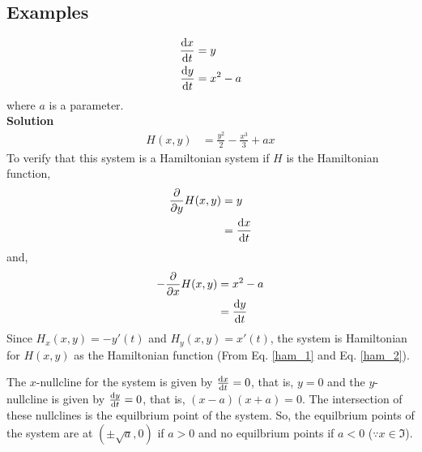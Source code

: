 \documentclass[11pt,1in]{article}
\newenvironment{Example}[2][Example]{\begin{trivlist}
		\item[\hskip \labelsep {\bfseries #1}\hskip \labelsep {\bfseries #2.}]}{\end{trivlist}}
\begin{document}
\subsection{Examples}
\begin{Example}{1}
	\begin{align*}
	\derivative{x}{t} &= y \\
	\derivative{y}{t} &= x^2 - a
	\end{align*}
	where $a$ is a parameter. \\
	{\bfseries Solution\\}
	\begin{align*}
	H(x,y) &= \frac{y^2}{2} - \frac{x^3}{3} + ax
	\end{align*}
	To verify that this system is a Hamiltonian system if $H$ is the Hamiltonian function,
	\begin{align*}
	\frac{\partial}{\partial y}H(x,y) &= y\\
	&= \derivative{x}{t}
	\end{align*}
	and,
	\begin{align*}
	- \frac{\partial}{\partial x} H(x,y) &= x^2 - a\\
	&= \derivative{y}{t}
	\end{align*}
	Since $H_x(x,y) = - y'(t)$ and $H_y(x,y) = x'(t)$, the system is Hamiltonian for $H(x,y)$ as the Hamiltonian function (From Eq. \ref{ham_1} and Eq. \ref{ham_2}).
	
	
	The $x$-nullcline for the system is given by $\derivative{x}{t} = 0$, that is, $y = 0$ and the $y$-nullcline is given by $\derivative{y}{t}=0$, that is, $(x -a)(x+a) = 0$. The intersection of these nullclines is the equilbrium point of the system. So, the equilbrium points of the system are at $(\pm\sqrt{a}, 0)$ if $a > 0$ and no equilbrium points if $a < 0$ ($\because x \in \Im$).
	

\end{Example}
\end{document}
